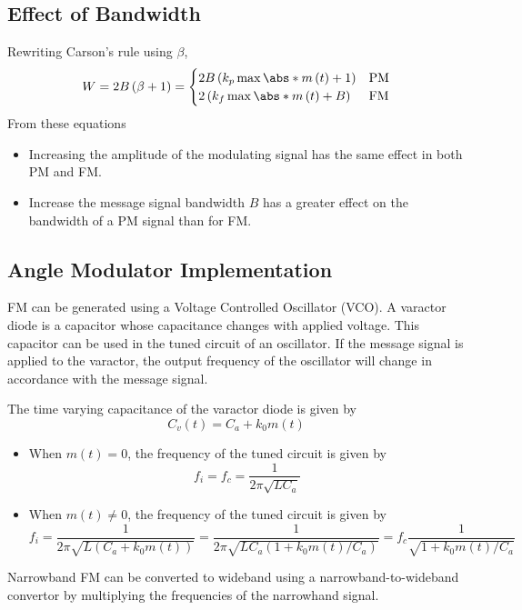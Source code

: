 \documentclass{article}
\begin{document}
\subsection{Effect of Bandwidth}
Rewriting Carson's rule using \(\beta\),
\begin{equation*}
    W = 2B \left( \beta + 1 \right) =
    \begin{cases}
        2B \left( k_p \max{\abs*{m\left( t \right)}} + 1 \right) & \text{PM} \\
        2 \left( k_f \max{\abs*{m\left( t \right)}} + B \right)  & \text{FM}
    \end{cases}
\end{equation*}
From these equations
\begin{itemize}
    \item Increasing the amplitude of the modulating signal has the
          same effect in both PM and FM.
    \item Increase the message signal bandwidth \(B\) has a greater
          effect on the bandwidth of a PM signal than for FM.
\end{itemize}
\subsection{Angle Modulator Implementation}
FM can be generated using a Voltage Controlled Oscillator (VCO). A
varactor diode is a capacitor whose capacitance changes with applied
voltage. This capacitor can be used in the tuned circuit of an
oscillator. If the message signal is applied to the varactor, the
output frequency of the oscillator will change in accordance with the
message signal.

The time varying capacitance of the varactor diode is given by
\begin{equation*}
    C_v\left( t \right) = C_a + k_0 m\left( t \right)
\end{equation*}
\begin{itemize}
    \item When \(m\left( t \right) = 0\), the frequency of the tuned
          circuit is given by
          \begin{equation*}
              f_i = f_c = \frac{1}{2 \pi \sqrt{L C_a}}
          \end{equation*}
    \item When \(m\left( t \right) \neq 0\), the frequency of the tuned
          circuit is given by
          \begin{equation*}
              f_i = \frac{1}{2 \pi \sqrt{L \left( C_a + k_0 m\left( t \right) \right)}} = \frac{1}{2 \pi \sqrt{L C_a \left( 1 + k_0 m\left( t \right) / C_a \right)}} = f_c \frac{1}{\sqrt{1 + k_0 m\left( t \right) / C_a}}
          \end{equation*}
\end{itemize}
Narrowband FM can be converted to wideband using a
narrowband-to-wideband convertor by multiplying the frequencies of the
narrowhand signal.
\end{document}
